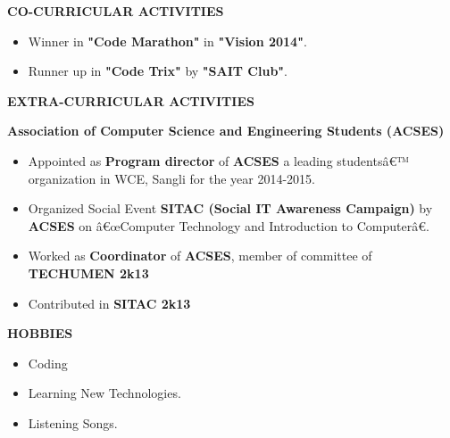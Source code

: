 \documentclass{article}
\begin{document}
\begin{framed}
	\large{\textbf{CO-CURRICULAR ACTIVITIES}}
\end{framed}
\begin{itemize}
	\item Winner in \textbf{"Code Marathon"} in \textbf{"Vision 2014"}.
	\item Runner up in \textbf{"Code Trix"}  by \textbf{ "SAIT Club"}.
\end{itemize}





\begin{framed}
	\large{\textbf{EXTRA-CURRICULAR ACTIVITIES}}
\end{framed}

\textbf{Association of Computer Science and Engineering Students (ACSES)}
\begin{itemize}	
	\item Appointed as \textbf{Program director} of \textbf{ACSES} a leading studentsâ€™ organization in WCE, Sangli for the year 2014-2015.
	\item Organized Social Event \textbf{SITAC (Social IT Awareness Campaign)} by \textbf{ACSES} on â€œComputer Technology and Introduction to Computerâ€.
	\item Worked as \textbf{Coordinator} of \textbf{ACSES}, member of committee of \textbf{TECHUMEN 2k13}
	\item Contributed in \textbf{SITAC 2k13}
	
\end{itemize}

\newpage


\begin{framed}
	\large{\textbf{HOBBIES}}
\end{framed}
\begin{itemize}
	\item Coding
	\item Learning New Technologies.
	\item Listening Songs. 
\end{itemize}
\end{document}
